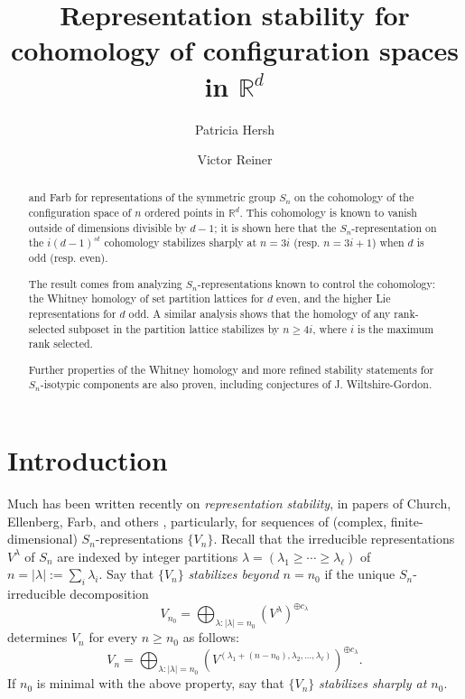 \documentclass[12pt]{amsart}
\title[Representation stability for configuration spaces in ${{\mathbb{R}}}^d$]
{Representation stability for cohomology of configuration spaces in ${{\mathbb{R}}}^d$}
\author{Patricia Hersh}
\author{Victor Reiner}\address{Department of Mathematics, University of Minnesota, Minneapolis, MN 55455}
\theoremstyle{plain}
\theoremstyle{definition}
\begin{document}
\begin{abstract}
and Farb for representations of the symmetric group $S_n$
on the cohomology of the configuration space of $n$ ordered points
in ${{\mathbb{R}}}^d$.  This cohomology is known to vanish outside of dimensions
divisible by $d-1$; it is shown here that the $S_n$-representation on the
$i(d-1)^{st}$ cohomology stabilizes sharply at $n=3i$ (resp. $n=3i+1$)
when $d$ is odd (resp. even).   

The result comes from analyzing $S_n$-representations known to
control the cohomology:  the Whitney homology of set partition lattices for $d$ even,
and the higher Lie representations for $d$ odd.  A similar analysis shows
that the homology of any rank-selected subposet in the partition lattice stabilizes by $n\geq 4i$,
where $i$ is the maximum rank selected.  

Further properties of the Whitney homology and
more refined stability statements for $S_n$-isotypic components are 
also proven, including conjectures of J. Wiltshire-Gordon.
\end{abstract}


\maketitle

\section{Introduction}

Much has been written recently on {\it representation stability}, 
in papers of Church, Ellenberg,  Farb, and others 
\cite{Church, Church-Farb,CEF,  CEF2, CEFN, Farb, Putman-Sam, Sam-Snowden,
Stembridge, Vakil-M.Wood, Wilson},
particularly, for sequences of (complex, finite-dimensional)
$S_n$-representations $\{V_n\}$.
Recall that the irreducible representations $V^\lambda$ of $S_n$ are
indexed by integer partitions $\lambda=(\lambda_1 \geq \cdots \geq \lambda_\ell)$ of
$n=|\lambda|:=\sum_i \lambda_i$.
Say that $\{V_n\}$ {\it stabilizes beyond $n=n_0$} if
the unique $S_n$-irreducible decomposition 
$$
V_{n_0}=\bigoplus_{\lambda: |\lambda|=n_0} \left( V^\lambda \right)^{\oplus c_\lambda}
$$
determines $V_n$ for every $n \geq n_0$ as follows:
$$
V_n=\bigoplus_{\lambda:|\lambda|=n_0} 
\left(
V^{(\lambda_1+(n-n_0),\lambda_2,\ldots,\lambda_\ell)} 
\right)^{\oplus c_\lambda}.
$$
If $n_0$ is minimal with the above property, say that $\{V_n\}$ {\it stabilizes sharply at $n_0$}.
\end{document}
